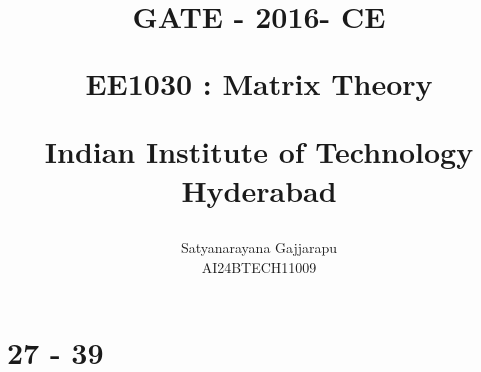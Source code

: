\documentclass[journal]{IEEEtran}
\begin{document}

\vspace{3cm}




\title{
GATE - 2016- CE

\large{EE1030 : Matrix Theory}

Indian Institute of Technology Hyderabad
}
\author{Satyanarayana Gajjarapu

AI24BTECH11009
}	





\maketitle




\bigskip

\renewcommand{\thefigure}{\theenumi}
\renewcommand{\thetable}{\theenumi}


\section{27 - 39}
\end{document}
